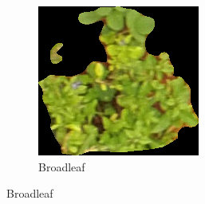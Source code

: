 \documentclass{report}
\begin{document}
\begin{figure}[H]
\centering
    \begin{subfigure}[b]{0.3\textwidth}
         \includegraphics[width=\textwidth]{Broadleaf.png}
         \caption{Broadleaf}
         \label{fig:1}
     \end{subfigure}
    

\end{figure}
\end{document}
